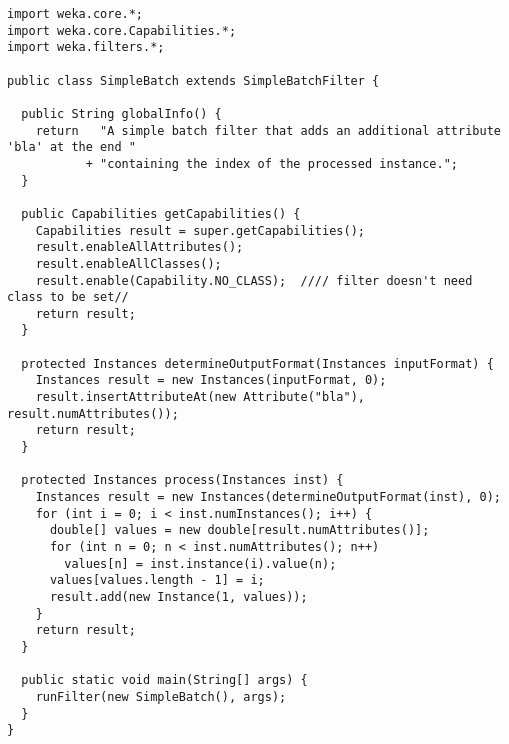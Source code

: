 
\begin{verbatim}
import weka.core.*;
import weka.core.Capabilities.*;
import weka.filters.*;

public class SimpleBatch extends SimpleBatchFilter {

  public String globalInfo() {
    return   "A simple batch filter that adds an additional attribute 'bla' at the end "
           + "containing the index of the processed instance.";
  }

  public Capabilities getCapabilities() {
    Capabilities result = super.getCapabilities();
    result.enableAllAttributes();
    result.enableAllClasses();
    result.enable(Capability.NO_CLASS);  //// filter doesn't need class to be set//
    return result;
  }

  protected Instances determineOutputFormat(Instances inputFormat) {
    Instances result = new Instances(inputFormat, 0);
    result.insertAttributeAt(new Attribute("bla"), result.numAttributes());
    return result;
  }

  protected Instances process(Instances inst) {
    Instances result = new Instances(determineOutputFormat(inst), 0);
    for (int i = 0; i < inst.numInstances(); i++) {
      double[] values = new double[result.numAttributes()];
      for (int n = 0; n < inst.numAttributes(); n++)
        values[n] = inst.instance(i).value(n);
      values[values.length - 1] = i;
      result.add(new Instance(1, values));
    }
    return result;
  }

  public static void main(String[] args) {
    runFilter(new SimpleBatch(), args);
  }
}
\end{verbatim}
